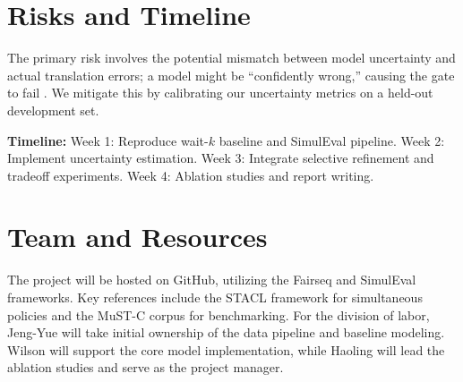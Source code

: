 \section{Risks and Timeline}
The primary risk involves the potential mismatch between model uncertainty and actual translation errors; a model might be ``confidently wrong,'' causing the gate to fail \citep{wang2020calibration}. We mitigate this by calibrating our uncertainty metrics on a held-out development set. 

\textbf{Timeline:} Week 1: Reproduce wait-$k$ baseline and SimulEval pipeline. Week 2: Implement uncertainty estimation. Week 3: Integrate selective refinement and tradeoff experiments. Week 4: Ablation studies and report writing.

\section{Team and Resources}
The project will be hosted on GitHub, utilizing the Fairseq and SimulEval frameworks. Key references include the STACL framework \citep{ma2019stacl} for simultaneous policies and the MuST-C corpus \citep{digangi2019mustc} for benchmarking. For the division of labor, Jeng-Yue will take initial ownership of the data pipeline and baseline modeling. Wilson will support the core model implementation, while Haoling will lead the ablation studies and serve as the project manager.